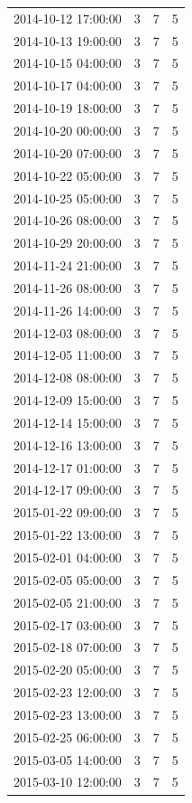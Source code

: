 \begin{tabular}{lrrr}
2014-10-12 17:00:00 & 3 & 7 & 5 \\
2014-10-13 19:00:00 & 3 & 7 & 5 \\
2014-10-15 04:00:00 & 3 & 7 & 5 \\
2014-10-17 04:00:00 & 3 & 7 & 5 \\
2014-10-19 18:00:00 & 3 & 7 & 5 \\
2014-10-20 00:00:00 & 3 & 7 & 5 \\
2014-10-20 07:00:00 & 3 & 7 & 5 \\
2014-10-22 05:00:00 & 3 & 7 & 5 \\
2014-10-25 05:00:00 & 3 & 7 & 5 \\
2014-10-26 08:00:00 & 3 & 7 & 5 \\
2014-10-29 20:00:00 & 3 & 7 & 5 \\
2014-11-24 21:00:00 & 3 & 7 & 5 \\
2014-11-26 08:00:00 & 3 & 7 & 5 \\
2014-11-26 14:00:00 & 3 & 7 & 5 \\
2014-12-03 08:00:00 & 3 & 7 & 5 \\
2014-12-05 11:00:00 & 3 & 7 & 5 \\
2014-12-08 08:00:00 & 3 & 7 & 5 \\
2014-12-09 15:00:00 & 3 & 7 & 5 \\
2014-12-14 15:00:00 & 3 & 7 & 5 \\
2014-12-16 13:00:00 & 3 & 7 & 5 \\
2014-12-17 01:00:00 & 3 & 7 & 5 \\
2014-12-17 09:00:00 & 3 & 7 & 5 \\
2015-01-22 09:00:00 & 3 & 7 & 5 \\
2015-01-22 13:00:00 & 3 & 7 & 5 \\
2015-02-01 04:00:00 & 3 & 7 & 5 \\
2015-02-05 05:00:00 & 3 & 7 & 5 \\
2015-02-05 21:00:00 & 3 & 7 & 5 \\
2015-02-17 03:00:00 & 3 & 7 & 5 \\
2015-02-18 07:00:00 & 3 & 7 & 5 \\
2015-02-20 05:00:00 & 3 & 7 & 5 \\
2015-02-23 12:00:00 & 3 & 7 & 5 \\
2015-02-23 13:00:00 & 3 & 7 & 5 \\
2015-02-25 06:00:00 & 3 & 7 & 5 \\
2015-03-05 14:00:00 & 3 & 7 & 5 \\
2015-03-10 12:00:00 & 3 & 7 & 5 \\

\end{tabular}

